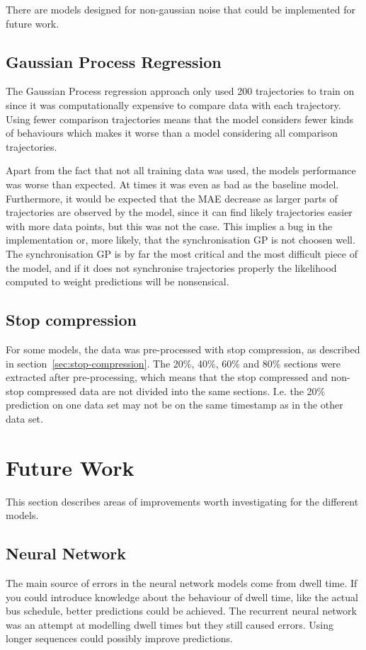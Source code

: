 There are models designed for non-gaussian noise that could be implemented for future work.

\subsection{Gaussian Process Regression}
The Gaussian Process regression approach only used 200 trajectories to train on since it was computationally expensive to compare data with each trajectory. Using fewer comparison trajectories means that the model considers fewer kinds of behaviours which makes it worse than a model considering all comparison trajectories.

Apart from the fact that not all training data was used, the models performance was worse than expected. At times it was even as bad as the baseline model. Furthermore, it would be expected that the MAE decrease as larger parts of trajectories are observed by the model, since it can find likely trajectories easier with more data points, but this was not the case. This implies a bug in the implementation or, more likely, that the synchronisation GP is not choosen well. The synchronisation GP is by far the most critical and the most difficult piece of the model, and if it does not synchronise trajectories properly the likelihood computed to weight predictions will be nonsensical.

\subsection{Stop compression}
For some models, the data was pre-processed with stop compression, as described in section~\ref{sec:stop-compression}. The 20\%, 40\%, 60\% and 80\% sections were extracted after pre-processing, which means that the stop compressed and non-stop compressed data are not divided into the same sections. I.e. the 20\% prediction on one data set may not be on the same timestamp as in the other data set.

\section{Future Work}
\label{sec:future-work}
This section describes areas of improvements worth investigating for the different models.

\subsection{Neural Network}
The main source of errors in the neural network models come from dwell time. If you could introduce knowledge about the behaviour of dwell time, like the actual bus schedule, better predictions could be achieved. The recurrent neural network was an attempt at modelling dwell times but they still caused errors. Using longer sequences could possibly improve predictions.

